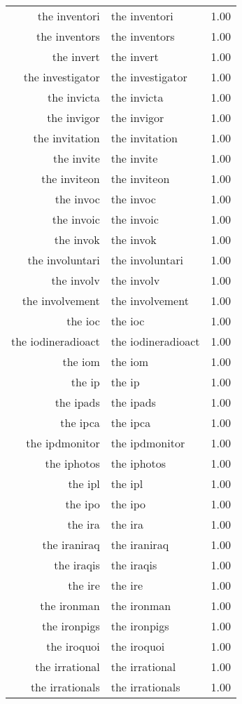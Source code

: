 \begin{table}[ht]
\begin{tabular}{rlr}
  the inventori & the inventori & 1.00 \\ 
  the inventors & the inventors & 1.00 \\ 
  the invert & the invert & 1.00 \\ 
  the investigator & the investigator & 1.00 \\ 
  the invicta & the invicta & 1.00 \\ 
  the invigor & the invigor & 1.00 \\ 
  the invitation & the invitation & 1.00 \\ 
  the invite & the invite & 1.00 \\ 
  the inviteon & the inviteon & 1.00 \\ 
  the invoc & the invoc & 1.00 \\ 
  the invoic & the invoic & 1.00 \\ 
  the invok & the invok & 1.00 \\ 
  the involuntari & the involuntari & 1.00 \\ 
  the involv & the involv & 1.00 \\ 
  the involvement & the involvement & 1.00 \\ 
  the ioc & the ioc & 1.00 \\ 
  the iodineradioact & the iodineradioact & 1.00 \\ 
  the iom & the iom & 1.00 \\ 
  the ip & the ip & 1.00 \\ 
  the ipads & the ipads & 1.00 \\ 
  the ipca & the ipca & 1.00 \\ 
  the ipdmonitor & the ipdmonitor & 1.00 \\ 
  the iphotos & the iphotos & 1.00 \\ 
  the ipl & the ipl & 1.00 \\ 
  the ipo & the ipo & 1.00 \\ 
  the ira & the ira & 1.00 \\ 
  the iraniraq & the iraniraq & 1.00 \\ 
  the iraqis & the iraqis & 1.00 \\ 
  the ire & the ire & 1.00 \\ 
  the ironman & the ironman & 1.00 \\ 
  the ironpigs & the ironpigs & 1.00 \\ 
  the iroquoi & the iroquoi & 1.00 \\ 
  the irrational & the irrational & 1.00 \\ 
  the irrationals & the irrationals & 1.00 \\ 

\end{tabular}
\end{table}
